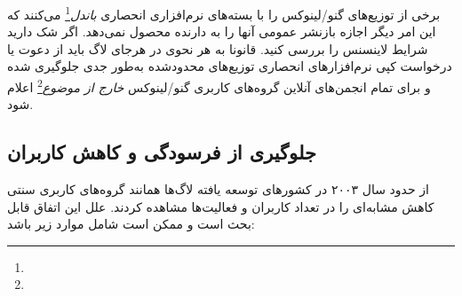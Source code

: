 
\begin{caveat}
برخی از توزیع‌های گنو/لینوکس را با بسته‌های نرم‌افزاری انحصاری
\emph{باندل}\footnote{}
می‌کنند که این امر
دیگر اجازه بازنشر عمومی آنها را به دارنده محصول نمی‌دهد. اگر شک دارید شرایط لاینسنس را بررسی کنید.
قانونا به هر نحوی در هرجای لاگ باید از دعوت یا درخواست کپی نرم‌افزارهای انحصاری توزیع‌های محدودشده
 به‌طور جدی جلوگیری شده و برای تمام انجمن‌های آنلاین گروه‌های کاربری گنو/لینوکس
\emph{خارج از موضوع}\footnote{}
اعلام شود.
\end{caveat}




\subsection{جلوگیری از فرسودگی و کاهش کاربران}

از حدود سال ۲۰۰۳ در کشورهای توسعه یافته لاگ‌ها همانند گروه‌های کاربری سنتی
کاهش مشابه‌ای را در تعداد کاربران و فعالیت‌ها مشاهده کردند. علل این اتفاق قابل بحث است
و ممکن است شامل موارد زیر باشد:


